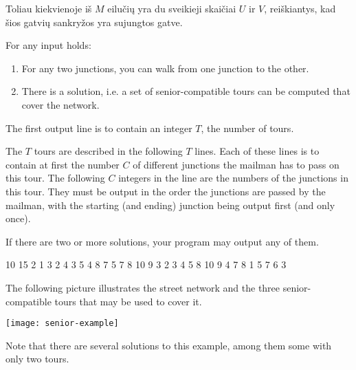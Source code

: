 \documentclass{boi2014-lt}
\begin{document}
    Toliau kiekvienoje iš $M$ eilučių yra du sveikieji skaičiai $U$ ir $V$, reiškiantys, kad šios gatvių sankryžos yra sujungtos gatve.

    For any input holds:
    \begin{enumerate}
        \item For any two junctions, you can walk from one junction to the other.
        \item There is a solution, i.e. a set of senior-compatible tours can be
        computed that cover the network.
    \end{enumerate}

    \Output
    The first output line is to contain an integer $T$, the number of tours.

    The $T$ tours are described in the following $T$ lines. Each of these lines
    is to contain at first the number $C$ of different junctions the mailman has
    to pass on this tour. The following $C$ integers in the line are the numbers
    of the junctions in this tour. They must be output in the order the
    junctions are passed by the mailman, with the starting (and ending) junction
    being output first (and only once).

    If there are two or more solutions, your program may output any of them.

    \Example

    \example
    {
        10 15  2  1 3  2 4  3 5  4 8  7  5 7  8  10  9
    }
    {
        3  2 3 4 5 8 10 9  4 7 8  1 5 7 6 3
    }
    {
        The following picture illustrates the street network and the three
        senior-compatible tours that may be used to cover it.

        \texttt{[image: senior-example]}

        Note that there are several solutions to this example, among them some
        with only two tours.
    
    }
\end{document}

